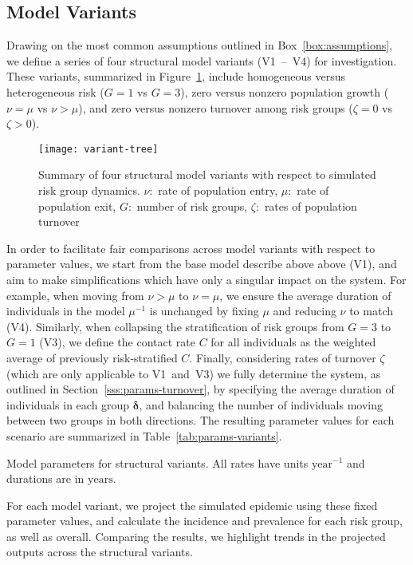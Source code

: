 \subsection{Model Variants}\label{ss:exp-variants}
Drawing on the most common assumptions outlined in Box~\ref{box:assumptions},
we define a series of four structural model variants (V1~--~V4) for investigation.
These variants, summarized in Figure~\ref{fig:variant-tree}, include
homogeneous versus heterogeneous risk ($G = 1$ vs $G = 3$),
zero versus nonzero population growth ($\nu = \mu$ vs $\nu > \mu$),
and zero versus nonzero turnover among risk groups ($\zeta = 0$ vs $\zeta > 0$).
\begin{figure}
  \centering
  \texttt{[image: variant-tree]}
  \caption{Summary of four structural model variants
    with respect to simulated risk group dynamics.
    $\nu$:~rate of population entry,
    $\mu$:~rate of population exit,
    $G$:~number of risk groups,
    $\zeta$:~rates of population turnover}
  \label{fig:variant-tree}
\end{figure}
\par
In order to facilitate fair comparisons across model variants with respect to parameter values,
we start from the base model describe above above (V1),
and aim to make simplifications which have only a singular impact on the system.
For example, when moving from $\nu > \mu$ to $\nu = \mu$,
we ensure the average duration of individuals in the model $\mu^{-1}$ is unchanged
by fixing $\mu$ and reducing $\nu$ to match (V4).
Similarly, when collapsing the stratification of risk groups from $G = 3$ to $G = 1$ (V3),
we define the contact rate $C$ for all individuals as
the weighted average of previously risk-stratified $C$.
Finally, considering rates of turnover $\zeta$
(which are only applicable to V1~and~V3)
we fully determine the system, as outlined in Section~\ref{sss:params-turnover},
by specifying the average duration of individuals in each group $\bm{\delta}$,
and balancing the number of individuals moving between two groups in both directions. %
The resulting parameter values for each scenario are summarized in Table~\ref{tab:params-variants}.
\begin{table}
  \centering
  \caption{Model parameters for structural variants.
    All rates have units $\mathrm{year}^{-1}$ and durations are in $\mathrm{years}$.}
  \label{tab:params-variants}
  
\end{table}
For each model variant,
we project the simulated epidemic using these fixed parameter values,
and calculate the incidence and prevalence for each risk group, as well as overall.
Comparing the results, we highlight trends in the projected outputs
across the structural variants.
